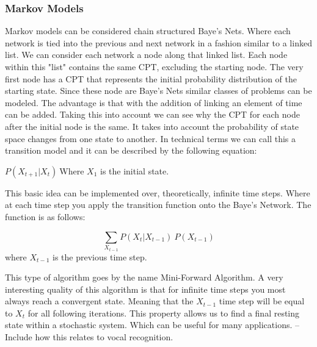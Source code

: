 \subsubsection{Markov Models}
Markov models can be considered chain structured Baye's Nets. Where each network is tied into the previous and next network in a fashion similar to a linked list. We can consider each network a node along that linked list. Each node within this "list" contains the same CPT, excluding the starting node. The very first node has a CPT that represents the initial probability distribution of the starting state. Since these node are Baye's Nets similar classes of problems can be modeled. The advantage is that with the addition of linking an element of time can be added. Taking this into account we can see why the CPT for each node after the initial node is the same. It takes into account the probability of state space changes from one state to another. In technical terms we can call this a transition model and it can be described by the following equation:
\vspace{10px}
\begin{center}
$P(X_{t+1}|X_{t})\:$Where $X_{1}$ is the initial state.
\end{center}
\vspace{10px}
This basic idea can be implemented over, theoretically, infinite time steps. Where at each time step you apply the transition function onto the Baye's Network. The function is as follows:
\vspace{10px}
\begin{center}
	$$\sum_{X_{t-1}} P(X_{t}|X_{t-1})\:P(X_{t-1})$$ where $X_{t-1}$ is the previous time step.
\end{center}
\vspace{10px}
This type of algorithm goes by the name Mini-Forward Algorithm. A very interesting quality of this algorithm is that for infinite time steps you most always reach a convergent state. Meaning that the $X_{t-1}$ time step will be equal to $X_{t}$ for all following iterations. This property allows us to find a final resting state within a stochastic system. Which can be useful for many applications.
--Include how this relates to vocal recognition.